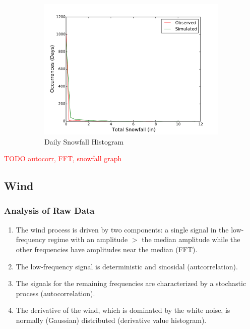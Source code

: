 \documentclass[11pt, letterpaper]{article}
\begin{document}
\begin{figure}[H]
\begin{subfigure}[b]{0.45\textwidth}
    \includegraphics[width=\textwidth]{figures/daily_snowfall_hist.pdf}
    \caption{Daily Snowfall Histogram}
  \end{subfigure}
  
  \label{fig:analysis}
  \caption{}
\end{figure}

\textcolor{red}{TODO autocorr, FFT, snowfall graph}

\subsection{Wind}

\subsubsection{Analysis of Raw Data}

\begin{enumerate}
\item The wind process is driven by two components: a single signal in the low-frequency regime with an amplitude $>$ the median amplitude while the other frequencies have amplitudes near the median (FFT).
\item The low-frequency signal is deterministic and sinosidal (autcorrelation).
\item The signals for the remaining frequencies are characterized by a stochastic process (autocorrelation).
\item The derivative of the wind, which is dominated by the white noise, is normally (Gaussian) distributed (derivative value histogram).
\end{enumerate}
\end{document}
